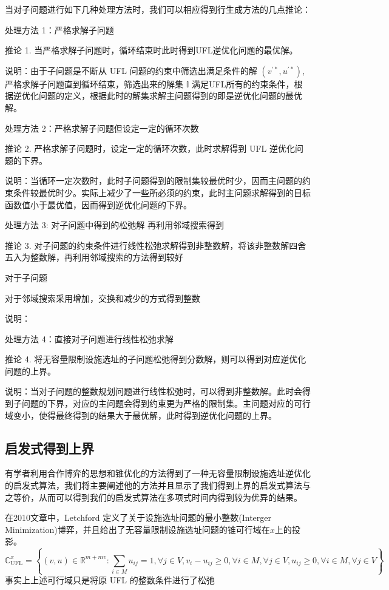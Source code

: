 \documentclass[UTF8]{article}
\begin{document}
当对子问题进行如下几种处理方法时，我们可以相应得到行生成方法的几点推论：

处理方法 1：严格求解子问题

推论 1. 当严格求解子问题时，循环结束时此时得到UFL逆优化问题的最优解。

说明：由于子问题是不断从 UFL 问题的约束中筛选出满足条件的解 $(v^{'*},u^{'*})$, 严格求解子问题直到循环结束，筛选出来的解集 $\mathbb{I}$ 满足UFL所有的约束条件，根据逆优化问题的定义，根据此时的解集求解主问题得到的即是逆优化问题的最优解。

处理方法 2：严格求解子问题但设定一定的循环次数

推论 2. 严格求解子问题时，设定一定的循环次数，此时求解得到 UFL 逆优化问题的下界。

说明：当循环一定次数时，此时子问题得到的限制集较最优时少，因而主问题的约束条件较最优时少。实际上减少了一些所必须的约束，此时主问题求解得到的目标函数值小于最优值，因而得到逆优化问题的下界。

处理方法 3: 对子问题中得到的松弛解 再利用邻域搜索得到

推论 3. 对子问题的约束条件进行线性松弛求解得到非整数解，将该非整数解四舍五入为整数解，再利用邻域搜索的方法得到较好

对于子问题

对于邻域搜索采用增加，交换和减少的方式得到整数

说明：

处理方法 4：直接对子问题进行线性松弛求解

推论 4. 将无容量限制设施选址的子问题松弛得到分数解，则可以得到对应逆优化问题的上界。

说明：当对子问题的整数规划问题进行线性松弛时，可以得到非整数解。此时会得到子问题的下界，对应的主问题会得到约束更为严格的限制集。主问题对应的可行域变小，使得最终得到的结果大于最优解，此时得到逆优化问题的上界。

\subsection{启发式得到上界}

有学者利用合作博弈的思想和锥优化的方法得到了一种无容量限制设施选址逆优化的启发式算法，我们将主要阐述他的方法并且显示了我们得到上界的启发式算法与之等价，从而可以得到我们的启发式算法在多项式时间内得到较为优异的结果。

在2010文章中，Letchford 定义了关于设施选址问题的最小整数(Interger Minimization)博弈，并且给出了无容量限制设施选址问题的锥可行域在$x$上的投影。
\[
\mathbb{C}_{\mathrm{UFL}}^{x}=\left\{(v, u) \in \mathbb{R}^{m+m v}: \sum_{i \in M} u_{i j}=1, \forall j \in V, v_{i}-u_{i j} \geq 0, \forall i \in M, \forall j \in V, u_{i j} \geq 0, \forall i \in M, \forall j \in V\right\}
\]
事实上上述可行域只是将原 UFL 的整数条件进行了松弛
\end{document}
